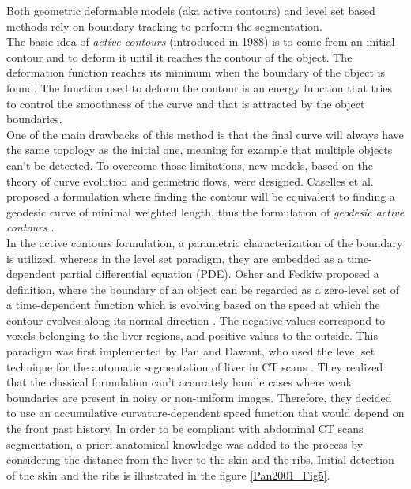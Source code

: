 \documentclass[]{article}
\begin{document}
	Both geometric deformable models (aka active contours) and level set
	based methods rely on boundary tracking to perform the segmentation.\\
	The basic idea of \emph{active contours} (introduced in 1988) is to
	come from an initial contour and to deform it until it reaches the
	contour of the object. The deformation function reaches its minimum when
	the boundary of the object is found. The function used to deform the
	contour is an energy function that tries to control the smoothness of
	the curve and that is attracted by the object boundaries.\\
	One of the main drawbacks of this method is that the final curve will
	always have the same topology as the initial one, meaning for example
	that multiple objects can't be detected. To overcome those limitations,
	new models, based on the theory of curve evolution and geometric flows,
	were designed.
	Caselles et al. proposed a formulation where finding the contour will be
	equivalent to finding a geodesic curve of minimal weighted length, thus
	the formulation of \emph{geodesic active contours} \cite{Caselles1997}.\\
	In the active contours formulation, a parametric characterization of the
	boundary is utilized, whereas in the level set paradigm, they are
	embedded as a time-dependent partial differential equation (PDE).
	Osher and Fedkiw proposed a definition, where the boundary of an object
	can be regarded as a zero-level set of a time-dependent function which
	is evolving based on the speed at which the contour evolves along its
	normal direction \cite{Osher2003}. The negative values correspond to voxels belonging to
	the liver regions, and positive values to the outside. This paradigm was
	first implemented by
	Pan and Dawant, who used the level set technique for the automatic segmentation of liver
	in CT scans \cite{Pan2001}. They realized that the classical formulation can't
	accurately handle cases where weak boundaries are present in noisy or
	non-uniform images. Therefore, they decided to use an accumulative
	curvature-dependent speed function that would depend on the front past
	history. In order to be compliant with abdominal CT scans segmentation,
	a priori anatomical knowledge was added to the process by considering
	the distance from the liver to the skin and the ribs. Initial detection
	of the skin and the ribs is illustrated in the figure \ref{Pan2001_Fig5}.
	
\end{document}
